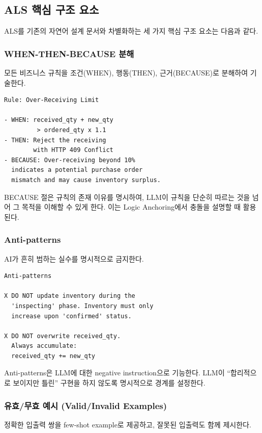\documentclass[conference]{IEEEtran}
\begin{document}
\subsection{ALS 핵심 구조 요소}

ALS를 기존의 자연어 설계 문서와 차별화하는 세 가지 핵심 구조 요소는 다음과 같다.

\subsubsection{WHEN-THEN-BECAUSE 분해}

모든 비즈니스 규칙을 조건(WHEN), 행동(THEN), 근거(BECAUSE)로 분해하여 기술한다.

\begin{lstlisting}
Rule: Over-Receiving Limit

- WHEN: received_qty + new_qty
         > ordered_qty x 1.1
- THEN: Reject the receiving
        with HTTP 409 Conflict
- BECAUSE: Over-receiving beyond 10%
  indicates a potential purchase order
  mismatch and may cause inventory surplus.
\end{lstlisting}

BECAUSE 절은 규칙의 존재 이유를 명시하여, LLM이 규칙을 단순히 따르는 것을 넘어 그 목적을 이해할 수 있게 한다. 이는 Logic Anchoring에서 충돌을 설명할 때 활용된다.

\subsubsection{Anti-patterns}

AI가 흔히 범하는 실수를 명시적으로 금지한다.

\begin{lstlisting}
Anti-patterns

X DO NOT update inventory during the
  'inspecting' phase. Inventory must only
  increase upon 'confirmed' status.

X DO NOT overwrite received_qty.
  Always accumulate:
  received_qty += new_qty
\end{lstlisting}

Anti-patterns은 LLM에 대한 negative instruction으로 기능한다. LLM이 ``합리적으로 보이지만 틀린'' 구현을 하지 않도록 명시적으로 경계를 설정한다.

\subsubsection{유효/무효 예시 (Valid/Invalid Examples)}

정확한 입출력 쌍을 few-shot example로 제공하고, 잘못된 입출력도 함께 제시한다.
\end{document}
